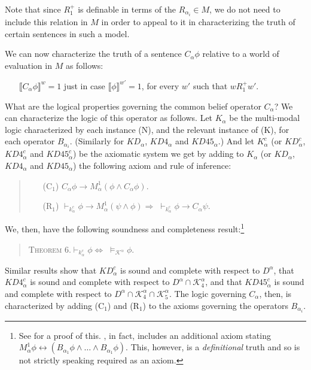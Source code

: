 Note that since $R^+_{1}$ is definable in terms of the $R_{\alpha_i} \in M$, we do not need to include this relation in $M$ in order to appeal to it in characterizing the truth of certain sentences in such a model.

We can now characterize the truth of a sentence $C_{\alpha} \phi$ relative to a world of evaluation in $M$ as follows:
\begin{itemize}
\item[] $\llbracket C_{\alpha} \phi \rrbracket^w = 1$ just in case $\llbracket \phi \rrbracket^{w'} = 1$, for every $w'$  such that $w R^+_{1} w'$.
\end{itemize}

What are the logical properties governing  the common belief operator $C_\alpha$?
We can characterize the logic of this operator as follows.
Let $K_\alpha$ be the multi-modal logic characterized by each instance (N), and the relevant instance of (K), for each operator $B_{\alpha_i}$.
(Similarly for $KD_\alpha$, $KD4_\alpha$ and $KD45_\alpha$.)
And let $K_\alpha^c$ (or $KD_\alpha^c$, $KD4_\alpha^c$ and $KD45_\alpha^c$) be the axiomatic system we get by adding to $K_\alpha$ (or $KD_\alpha$, $KD4_\alpha$ and $KD45_\alpha$) the following axiom and rule of inference:
\begin{quote}
\begin{itemize}
\item[(C$_1$)]\quad $C_\alpha \phi \rightarrow M_\alpha^1( \phi \wedge C_\alpha \phi)$.
\item[(R$_1$)]\quad $\vdash_{k_\alpha^c}  \phi \rightarrow M_\alpha^1(\psi \wedge \phi) \Rightarrow \; \vdash_{k_\alpha^c} \phi \rightarrow C_\alpha \psi$.
\end{itemize}
\end{quote}
We, then, have the following soundness and completeness result:\footnote{See \citet{Halpern1} for a proof of this. \citet{Halpern1}, in fact, includes an additional axiom stating $M_\alpha^1 \phi \leftrightarrow (B_{\alpha_1} \phi \wedge\ldots\wedge B_{\alpha_1} \phi)$. This, however, is a \textit{definitional} truth and so is not strictly speaking required as an axiom.}
\begin{quote}
\textsc{Theorem 6.}\quad $\vdash_{k_\alpha^c}  \phi \Leftrightarrow \; \models_{\mathcal{K}^\alpha} \phi$.
\end{quote}
Similar results show that $KD_\alpha^c$ is sound and complete with respect to $D^\alpha$, that $KD4_\alpha^c$ is sound and complete with respect to $D^\alpha \cap \mathcal{K}^\alpha_4$, and that $KD45_\alpha^c$ is sound and complete with respect to $D^\alpha \cap \mathcal{K}^\alpha_4 \cap \mathcal{K}^\alpha_5$.
The logic governing $C_\alpha$, then, is characterized by adding (C$_1$) and (R$_1$) to the axioms governing the operators $B_{\alpha_i}$.

